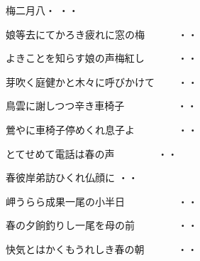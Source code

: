 \vspace{0.6cm}
\begin{shiika}梅二月八・
\hfill{・・}\end{shiika}
\vspace{0.6cm}
\begin{shiika}娘等去にてかろき疲れに窓の梅　　　
\hfill{・・}\end{shiika}
\vspace{0.6cm}
\begin{shiika}よきことを知らす娘の声梅紅し　　　
\hfill{・・}\end{shiika}
\vspace{0.6cm}
\begin{shiika}芽吹く庭健かと木々に呼びかけて　　
\hfill{・・}\end{shiika}
\vspace{0.6cm}
\begin{shiika}鳥雲に謝しつつ辛き車椅子　　　　　
\hfill{・・}\end{shiika}
\vspace{0.6cm}
\begin{shiika}鶯やに車椅子停めくれ息子よ　　　　
\hfill{・・}\end{shiika}
\vspace{0.6cm}
\begin{shiika}とてせめて電話は春の声　　　　
\hfill{・・}\end{shiika}
\vspace{0.6cm}
\begin{shiika}春彼岸弟訪ひくれ仏顔に
\hfill{・・}\end{shiika}
\vspace{0.6cm}
\begin{shiika}岬うらら成果一尾の小半日　　　　　
\hfill{・・}\end{shiika}
\vspace{0.6cm}
\begin{shiika}春の夕餉釣りし一尾を母の前　　　　
\hfill{・・}\end{shiika}
\vspace{0.6cm}
\begin{shiika}快気とはかくもうれしき春の朝　　　
\hfill{・・}\end{shiika}
